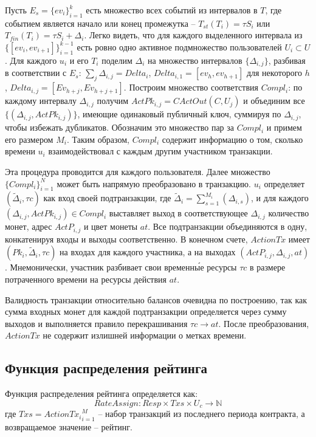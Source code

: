 \documentclass[specification,annotation]{itmo-student-thesis}
\begin{document}
Пусть $E_s = \{ev_i\}_{i=1}^k$ есть множество всех событий из
интервалов в $T$, где событием является начало или конец промежутка --
$T_{st}(T_i) = \tau S_i$ или $T_{fin}(T_i) = \tau S_i +
\Delta_i$. Легко видеть, что для каждого выделенного интервала из
$\{[ev_i, ev_{i+1}]\}_{i=1}^{k-1}$ есть ровно одно активное
подмножество пользователей $U_i \subset U$. Для каждого $u_i$ и его
$T_i$ поделим $\Delta_i$ на множество интервалов $\{\Delta_{i,j}\}$,
разбивая в соответствии с $E_s$: $\sum_{j}{\Delta_{i,j}} = Delta_i$,
$Delta_{i,1} = [ev_h, ev_{h+1}]$ для некоторого $h$, $Delta_{i,j} =
[Ev_{h+j},Ev_{h+j+1}]$. Построим множество соответствия $Compl_i$: по
каждому интервалу $\Delta_{i,j}$ получим $ActPk_{i,j} = CActOut(C,
U_j)$ и объединим все $\{(\Delta_{i,j}, ActPk_{i,j})\}$, имеющие
одинаковый публичный ключ, суммируя по $\Delta_{i,j}$, чтобы избежать
дубликатов. Обозначим это множество пар за $Compl_i$ и примем его
размером $M_i$. Таким образом, $Compl_i$ содержит информацию о том,
сколько времени $u_i$ взаимодействовал с каждым другим участником
транзакции.

Эта процедура проводится для каждого пользователя. Далее множество
$\{Compl_i\}_{i=1}^N$ может быть напрямую преобразовано в
транзакцию. $u_i$ определяет $(\tilde{\Delta}_i, \tau c)$ как вход
своей подтранзакции, где $\tilde{\Delta}_i =
\sum_{s=1}^{M_i}(\Delta_{i,s})$, и для каждого $(\Delta_{i,j},
ActPk_{i,j}) \in Compl_i$ выставляет выход в соответствующее
$\Delta_{i,j}$ количество монет, адрес $ActP_{i,j}$ и цвет монеты
$at$. Все подтранзакции объединяются в одну, конкатенируя входы и
выходы соответственно. В конечном счете, $ActionTx$ имеет $(Pk_i,
\tilde{\Delta}_i, \tau c)$ на входах для каждого участника, а на
выходах $(ActP_{i,j}, \Delta_{i,j}, at)$. Мнемонически, участник
разбивает свои временн\'{ы}е ресурсы $\tau c$ в размере потраченного
времени на ресурсы действия $at$.

Валидность транзакции относительно балансов очевидна по построению,
так как сумма входных монет для каждой подтранзакции определяется
через сумму выходов и выполняется правило перекрашивания $\tau c
\rightarrow at$. После преобразования, $ActionTx$ не содержит
излишней информации о метках времени.

\subsection{Функция распределения рейтинга}

Функция распределения рейтинга определяется как:
\[RateAssign : Resp \times Txs \times U_c \rightarrow \mathbb{N}\]
где $Txs = {ActionTx_i}_{i=1}^M$ -- набор транзакций из последнего
периода контракта, а возвращаемое значение -- рейтинг.
\end{document}
